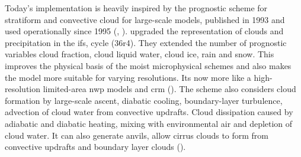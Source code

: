 Today's implementation is heavily inspired by the prognostic scheme for stratiform and convective cloud for large-scale models, published in 1993 and used operationally since 1995 (\cite{Tiedtke1993}, \cite{Tomkins2005}). %
 upgraded the representation of clouds and precipitation in the \acrshort{ifs}, cycle (36r4).
They extended the number of prognostic variables cloud fraction, cloud liquid water, cloud ice, rain and snow. This improves the physical basis of the moist microphysical schemes and also makes the model more suitable for varying resolutions. Its now more like a high-resolution limited-area \acrshort{nwp} models and \acrshort{crm} (\cite{Forbes2011AnPrecipitation}).
The scheme also considers cloud formation by large-scale ascent, diabatic cooling, boundary-layer turbulence, advection of cloud water from convective updrafts. Cloud dissipation caused by adiabatic and diabatic heating, mixing with environmental air and depletion of cloud water. It can also generate anvils, allow cirrus clouds to form from convective updrafts and boundary layer clouds (\cite{Tiedtke1993}).
